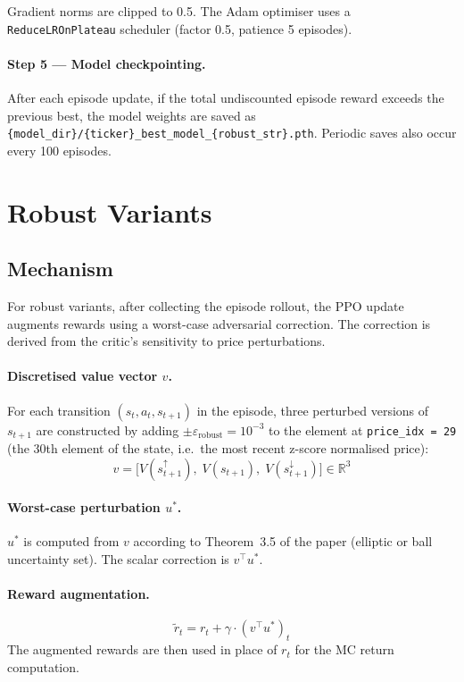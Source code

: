 \documentclass[11pt,a4paper]{article}
\begin{document}
Gradient norms are clipped to 0.5. The Adam optimiser uses a \texttt{ReduceLROnPlateau} scheduler (factor 0.5, patience 5 episodes).

\paragraph{Step 5 --- Model checkpointing.}
After each episode update, if the total undiscounted episode reward exceeds the previous best, the model weights are saved as \texttt{\{model\_dir\}/\{ticker\}\_best\_model\_\{robust\_str\}.pth}. Periodic saves also occur every 100 episodes.

\section{Robust Variants}
\label{sec:robust}

\subsection{Mechanism}

For robust variants, after collecting the episode rollout, the PPO update augments rewards using a worst-case adversarial correction. The correction is derived from the critic's sensitivity to price perturbations.

\paragraph{Discretised value vector $v$.}
For each transition $(s_t, a_t, s_{t+1})$ in the episode, three perturbed versions of $s_{t+1}$ are constructed by adding $\pm\varepsilon_{\text{robust}} = 10^{-3}$ to the element at \texttt{price\_idx = 29} (the 30th element of the state, i.e.\ the most recent z-score normalised price):
\[
  v = \bigl[V(s_{t+1}^{\uparrow}),\; V(s_{t+1}),\; V(s_{t+1}^{\downarrow})\bigr] \in \mathbb{R}^3
\]

\paragraph{Worst-case perturbation $u^*$.}
$u^*$ is computed from $v$ according to Theorem~3.5 of the paper (elliptic or ball uncertainty set). The scalar correction is $v^\top u^*$.

\paragraph{Reward augmentation.}
\[
  \tilde{r}_t = r_t + \gamma \cdot (v^\top u^*)_t
\]
The augmented rewards are then used in place of $r_t$ for the MC return computation.
\end{document}
